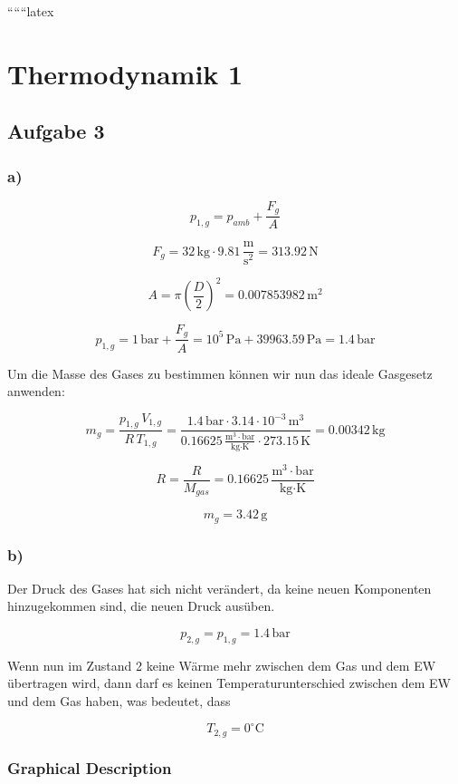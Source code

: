 
``````latex


\section*{Thermodynamik 1}

\subsection*{Aufgabe 3}

\subsubsection*{a)}

\[
p_{1,g} = p_{amb} + \frac{F_g}{A}
\]

\[
F_g = 32 \, \text{kg} \cdot 9.81 \, \frac{\text{m}}{\text{s}^2} = 313.92 \, \text{N}
\]

\[
A = \pi \left(\frac{D}{2}\right)^2 = 0.007853982 \, \text{m}^2
\]

\[
p_{1,g} = 1 \, \text{bar} + \frac{F_g}{A} = 10^5 \, \text{Pa} + 39963.59 \, \text{Pa} = 1.4 \, \text{bar}
\]

Um die Masse des Gases zu bestimmen können wir nun das ideale Gasgesetz anwenden:

\[
m_g = \frac{p_{1,g} \, V_{1,g}}{R \, T_{1,g}} = \frac{1.4 \, \text{bar} \cdot 3.14 \cdot 10^{-3} \, \text{m}^3}{0.16625 \, \frac{\text{m}^3 \cdot \text{bar}}{\text{kg} \cdot \text{K}} \cdot 273.15 \, \text{K}} = 0.00342 \, \text{kg}
\]

\[
R = \frac{R}{M_{gas}} = 0.16625 \, \frac{\text{m}^3 \cdot \text{bar}}{\text{kg} \cdot \text{K}}
\]

\[
m_g = 3.42 \, \text{g}
\]

\subsubsection*{b)}

Der Druck des Gases hat sich nicht verändert, da keine neuen Komponenten hinzugekommen sind, die neuen Druck ausüben.

\[
p_{2,g} = p_{1,g} = 1.4 \, \text{bar}
\]

Wenn nun im Zustand 2 keine Wärme mehr zwischen dem Gas und dem EW übertragen wird, dann darf es keinen Temperaturunterschied zwischen dem EW und dem Gas haben, was bedeutet, dass

\[
T_{2,g} = 0^\circ \text{C}
\]

\subsubsection*{Graphical Description}

